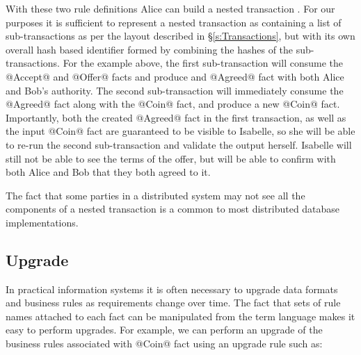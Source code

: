 With these two rule definitions Alice can build a nested transaction \CITE. For our purposes it is sufficient to represent a nested transaction as containing a list of sub-transactions as per the layout described in \S\ref{s:Transactions}, but with its own overall hash based identifier formed by combining the hashes of the sub-transactions. For the example above, the first sub-transaction will consume the @Accept@ and @Offer@ facts and produce and @Agreed@ fact with both Alice and Bob's authority. The second sub-transaction will immediately consume the @Agreed@ fact along with the @Coin@ fact, and produce a new @Coin@ fact. Importantly, both the created @Agreed@ fact in the first transaction, as well as the input @Coin@ fact are guaranteed to be visible to Isabelle, so she will be able to re-run the second sub-transaction and validate the output herself. Isabelle will still not be able to see the terms of the offer, but will be able to confirm with both Alice and Bob that they both agreed to it.

The fact that some parties in a distributed system may not see all the components of a nested transaction is a common to most distributed database implementations.




\eject{}
\subsection{Upgrade}
In practical information systems it is often necessary to upgrade data formats and business rules as requirements change over time. The fact that sets of rule names attached to each fact can be manipulated from the term language makes it easy to perform upgrades. For example, we can perform an upgrade of the business rules associated with @Coin@ fact using an upgrade rule such as:

